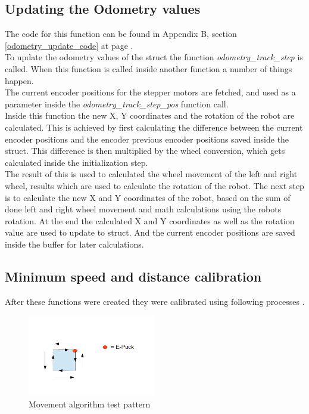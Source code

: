 \subsection{Updating the Odometry values}
\label{odometry_update_description}
The code for this function can be found in Appendix B, section \ref{odometry_update_code} at page \pageref{odometry_update_code}.\\
To update the odometry values of the struct the function \textit{odometry\_track\_step} is called.
When this function is called inside another function a number of things happen.\\
The current encoder positions for the stepper motors are fetched, 
and used as a parameter inside the \textit{odometry\_track\_step\_pos} function call. \\
Inside this function the new X, Y coordinates and the rotation of the robot are calculated. This is achieved by first calculating the difference between the current encoder positions and the encoder previous encoder positions saved inside the struct. 
This difference is then multiplied by the wheel conversion, which gets calculated inside the initialization step. \\
The result of this is used to calculated the wheel movement of the left and right wheel, results which are used to calculate the rotation of the robot. 
The next step is to calculate the new X and Y coordinates of the robot, based on the sum of done left and right wheel movement  and math calculations using the robots rotation. 
At the end the calculated X and Y coordinates as well as the rotation value are used to update to struct. And the current encoder positions are saved inside the buffer for later calculations. 

\subsection{Minimum speed and distance calibration}
\label{mov_calibration}
After these functions were created they were calibrated using following processes .\\

\begin{figure}[h]
\centering
\includegraphics[width = 0.5\textwidth]{../../figures/movement_test.png} 
\caption{Movement algorithm test pattern}
\label{movement_test}
\end{figure}

